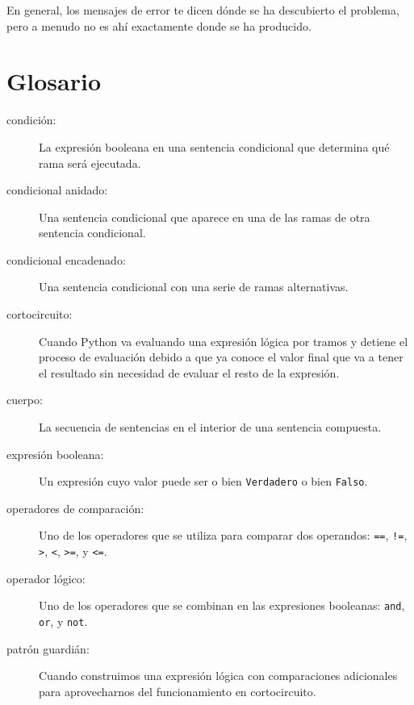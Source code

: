 
En general, los mensajes de error te dicen dónde se ha descubierto el problema,
pero a menudo no es ahí exactamente donde se ha producido.


\section{Glosario}

\begin{description}

\item[condición:] La expresión booleana en una sentencia condicional
que determina qué rama será ejecutada.

\item[condicional anidado:]  Una sentencia condicional que aparece
en una de las ramas de otra sentencia condicional.

\item[condicional encadenado:]  Una sentencia condicional con una serie
de ramas alternativas.
	
\item[cortocircuito:]  Cuando Python va evaluando una expresión lógica
por tramos y detiene el proceso de evaluación debido a que ya
conoce el valor final que va a tener el resultado
sin necesidad de evaluar el resto de la expresión.

\item[cuerpo:] La secuencia de sentencias en el interior de una sentencia compuesta.

\item[expresión booleana:]  Un expresión cuyo valor puede ser o bien 
{\tt Verdadero} o bien {\tt Falso}.

\item[operadores de comparación:] Uno de los operadores que se utiliza para comparar
dos operandos: {\tt ==}, {\tt !=}, {\tt \verb">"}, {\tt \verb"<"}, {\tt \verb">="}, y {\tt \verb"<="}.

\item[operador lógico:] Uno de los operadores que se combinan en las expresiones
booleanas: {\tt and}, {\tt or}, y {\tt not}.

\item[patrón guardián:] Cuando construimos una expresión lógica
con comparaciones adicionales
para aprovecharnos del funcionamiento en cortocircuito.


\end{description}
